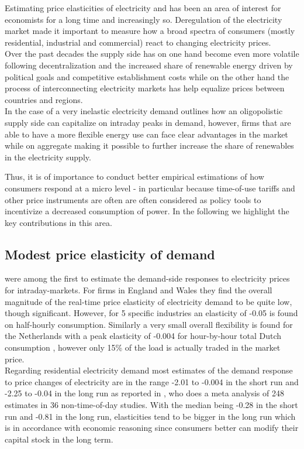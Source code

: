 \label{sec:background}
Estimating price elasticities of electricity and has been an area of interest for economists for a long time and increasingly so. Deregulation of the electricity market made it important to measure how a broad spectra of consumers (mostly residential, industrial and commercial) react to changing electricity prices.
\medskip\\
Over the past decades the supply side has on one hand become even more volatile following decentralization and the increased share of renewable energy driven by political goals and competitive establishment costs while on the other hand the process of interconnecting electricity markets has help equalize prices between countries and regions.
\medskip\\
In the case of a very inelastic electricity demand \citet{wolak2001impact} outlines how an oligopolistic supply side can capitalize on intraday peaks in demand, however, firms that are able to have a more flexible energy use can face clear advantages in the market while on aggregate making it possible to further increase the share of renewables in the electricity supply.
\par
Thus, it is of importance to conduct better empirical estimations of how consumers respond at a micro level - in particular because time-of-use tariffs and other price instruments are often are often considered as policy tools to incentivize a decreased consumption of power. In the following we highlight the key contributions in this area.

\subsection{Modest price elasticity of demand}
\label{subsec:b_results}
\citet{patrick2001estimating} were among the first to estimate the demand-side responses to electricity prices for intraday-markets. For firms in England and Wales they find the overall magnitude of the real-time price elasticity of electricity demand to be quite low, though significant. However, for 5 specific industries an elasticity of -0.05 is found on half-hourly consumption. Similarly a very small overall flexibility is found for the Netherlands with a peak elasticity of -0.004 for hour-by-hour total Dutch consumption \citet{lijesen2007real}, however only 15\% of the load is actually traded in the market price.
\medskip\\
Regarding residential electricity demand most estimates of the demand response to price changes of electricity are in the range -2.01 to -0.004 in the short run and -2.25 to -0.04 in the long run as reported in \citet{espey2004turning}, who does a meta analysis of 248 estimates in 36 non-time-of-day studies. With the median being -0.28 in the short run and -0.81 in the long run, elasticities tend to be bigger in the long run which is in accordance with economic reasoning since consumers better can modify their capital stock in the long term.

